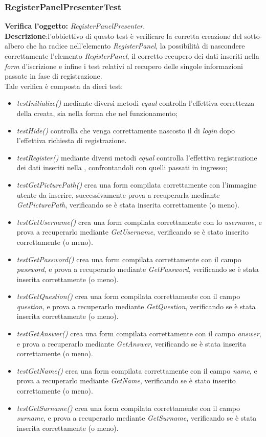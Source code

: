 \subsubsection{RegisterPanelPresenterTest}
\textbf{Verifica l'oggetto:} \textit{RegisterPanelPresenter}.\\
\textbf{Descrizione}:l'obbiettivo di questo test è verificare la corretta creazione del sotto-albero che ha radice nell'elemento \textit{RegisterPanel}, la possibilità di nascondere correttamente l'elemento \textit{RegisterPanel}, il corretto recupero dei dati inseriti nella \textit{form} d'iscrizione e infine i test relativi al recupero delle singole informazioni passate in fase di registrazione.\\
Tale verifica è composta da dieci test:
\begin{itemize}
\item \textit{testInitialize() } mediante diversi metodi \textit{equal} controlla l'effettiva correttezza della  creata, sia nella forma che nel funzionamento;
\item \textit{testHide() } controlla che venga correttamente nascosto il  di \textit{login} dopo l'effettiva richiesta di registrazione.
\item \textit{testRegister() } mediante diversi metodi \textit{equal} controlla l'effettiva registrazione dei dati inseriti nella , confrontandoli con quelli passati in ingresso;
\item \textit{testGetPicturePath() } crea una form compilata correttamente con l'immagine utente da inserire, successivamente prova a recuperarla mediante \textit{GetPicturePath}, verificando se è stata inserita correttamente (o meno). 
\item \textit{testGetUsername() } crea una form compilata correttamente con lo \textit{username}, e prova a recuperarlo mediante \textit{GetUsername}, verificando se è stato inserito correttamente (o meno).
\item \textit{testGetPassword() } crea una form compilata correttamente con il campo \textit{password}, e prova a recuperarlo mediante \textit{GetPassword}, verificando se è stata inserita correttamente (o meno).
\item \textit{testGetQuestion() }  crea una form compilata correttamente con il campo \textit{question}, e prova a recuperarlo mediante \textit{GetQuestion}, verificando se è stata inserita correttamente (o meno).
\item \textit{testGetAnswer() } crea una form compilata correttamente con il campo \textit{answer}, e prova a recuperarlo mediante \textit{GetAnswer}, verificando se è stata inserita correttamente (o meno).
\item \textit{testGetName() }  crea una form compilata correttamente con il campo \textit{name}, e prova a recuperarlo mediante \textit{GetName}, verificando se è stato inserito correttamente (o meno).
\item \textit{testGetSurname() }  crea una form compilata correttamente con il campo \textit{surname}, e prova a recuperarlo mediante \textit{GetSurname}, verificando se è stata inserita correttamente (o meno).

\end{itemize}
